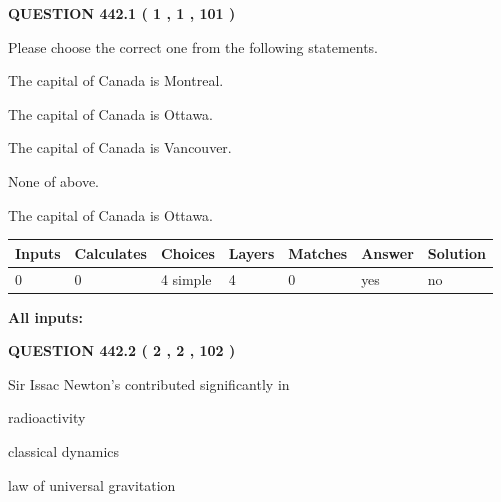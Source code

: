 \documentclass[12pt]{article}
\begin{document}
{\textbf{\Large{QUESTION
442.1 
 ( 1 , 1 , 101 )
}}}
  
  
Please choose the correct one from the following statements.
 
 
The capital of Canada is Montreal.
 
 
The capital of Canada is Ottawa.
 
 
The capital of Canada is Vancouver.
 
 
 None of above.
 
 
\noindent{}
 
 
The capital of Canada is Ottawa.
 
 
\noindent{}
 
 
   
   
   
   
\noindent\begin{tabular}{|l|l|l|l|l|l|l|}
 \hline
Inputs & Calculates & Choices & Layers & Matches & Answer & Solution \\ \hline
 0  & 
 0  & 
 4
  simple  
  & 
 4  & 
 0  & 
  yes & 
  no 
  \\ \hline
 \end{tabular}
   
   
   
   
\noindent{}
   
   
   
   
\noindent\vspace{0.1in}\hspace{-0.08in} {\textbf{\Large{All inputs: }}}
   
   
  
\vspace{0.2in}
  
{\textbf{\Large{QUESTION
442.2 
 ( 2 , 2 , 102 )
}}}
  
  
Sir Issac Newton's contributed significantly in
 
 
radioactivity
 
 
classical dynamics
 
 
law of universal gravitation
 
\end{document}
